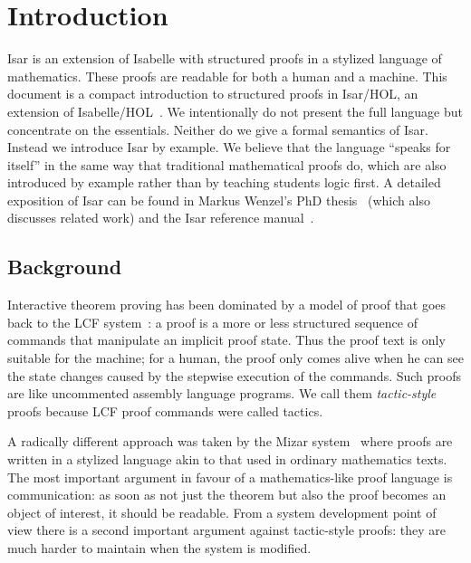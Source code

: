\section{Introduction}

Isar is an extension of Isabelle with structured proofs in a stylized
language of mathematics. These proofs are readable for both a human
and a machine.  This document is a compact introduction to structured
proofs in Isar/HOL, an extension of Isabelle/HOL~\cite{LNCS2283}. We
intentionally do not present the full language but concentrate on the
essentials. Neither do we give a formal semantics of Isar. Instead we
introduce Isar by example. We believe that the language ``speaks for
itself'' in the same way that traditional mathematical proofs do,
which are also introduced by example rather than by teaching students
logic first. A detailed exposition of Isar can be found in Markus
Wenzel's PhD thesis~\cite{Wenzel-PhD} (which also discusses related
work) and the Isar reference manual~\cite{Isar-Ref-Man}.

\subsection{Background}

Interactive theorem proving has been dominated by a model of proof
that goes back to the LCF system~\cite{LCF}: a proof is a more or less
structured sequence of commands that manipulate an implicit proof
state. Thus the proof text is only suitable for the machine; for a
human, the proof only comes alive when he can see the state changes
caused by the stepwise execution of the commands. Such proofs are like
uncommented assembly language programs. We call them
\emph{tactic-style} proofs because LCF proof commands were called
tactics.

A radically different approach was taken by the Mizar
system~\cite{Rudnicki92} where proofs are written in a stylized language akin
to that used in ordinary mathematics texts. The most important argument in
favour of a mathematics-like proof language is communication: as soon as not
just the theorem but also the proof becomes an object of interest, it should
be readable.  From a system development point of view there is a second
important argument against tactic-style proofs: they are much harder to
maintain when the system is modified.

